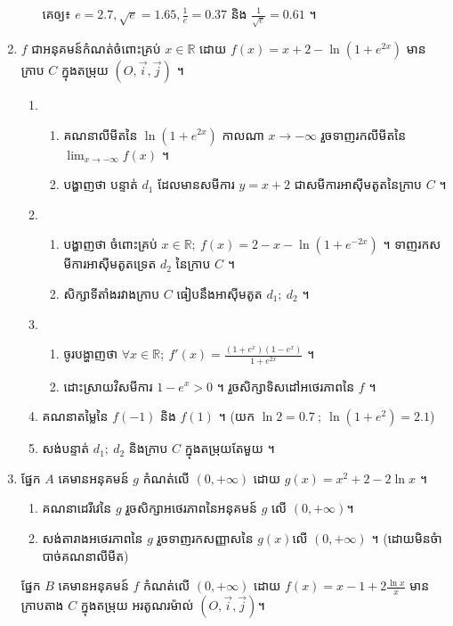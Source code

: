 \documentclass{officialexam}
\begin{document}
\begin{enumerate}[I]
\begin{enumerate}[k]
		គេឲ្យ៖ $e=2.7, \sqrt{e}=1.65, \frac{1}{e}=0.37$ និង $ \frac{1}{\sqrt{e}}=0.61$ ។
	\end{enumerate}
	\item $f$ ជាអនុគមន៍កំណត់ចំពោះគ្រប់ $x\in\mathbb{R}$ ដោយ $f(x)=x+2-\ln\left(1+e^{2x}\right)$ មានក្រាប $C$ ក្នុងតម្រុយ $\left(O, \vec{i}, \vec{j}\right)$ ។
	\begin{enumerate}[1]
		\item \begin{enumerate}[k]
			\item គណនាលីមីតនៃ $\ln\left(1+e^{2x}\right)$ កាលណា $x\to-\infty$ រួចទាញរកលីមីតនៃ $\lim_{x\to-\infty}f(x)$ ។
			\item បង្ហាញថា បន្ទាត់ $d_1$ ដែលមានសមីការ $y=x+2$ ជាសមីការអាស៊ីមតូតនៃក្រាប $C$ ។
		\end{enumerate}
		\item \begin{enumerate}[k]
			\item បង្ហាញថា ចំពោះគ្រប់ $x\in\mathbb{R};~ f(x)=2-x-\ln\left(1+e^{-2x}\right)$ ។ ទាញរកសមីការអាស៊ីមតូតទ្រេត $d_2$ នៃក្រាប $C$ ។
			\item សិក្សាទីតាំងរវាងក្រាប $C$ ធៀបនឹងអាស៊ីមតូត $d_1;~d_2$ ។
		\end{enumerate}
		\item \begin{enumerate}[k]
			\item ចូរបង្ហាញថា $\forall x\in\mathbb{R};~f'(x)=\frac{\left(1+e^x\right)\left(1-e^x\right)}{1+e^{2x}}$ ។
			\item ដោះស្រាយវិសមីការ $1-e^x>0$ ។ រួចសិក្សាទិសដៅអថេរភាពនៃ $f$ ។
		\end{enumerate}
		\item គណនាតម្លៃនៃ $f(-1)$ និង $f(1)$ ។ (យក $\ln2=0.7~;~\ln\left(1+e^2\right)=2.1$)
		\item សង់បន្ទាត់ $d_1;~d_2$ និងក្រាប $C$ ក្នុងតម្រុយតែមួយ ។
	\end{enumerate}
	\item {\color{khtug}\sffamily ផ្នែក $A$} គេមានអនុគមន៍ $g$ កំណត់លើ $(0,+\infty)$ ដោយ $g(x)=x^2+2-2\ln x$ ។
	\begin{enumerate}[k]
		\item គណនាដេរីវេនៃ $g$ រួចសិក្សាអថេរភាពនៃអនុគមន៍ $g$ លើ $(0, +\infty)$​។
		\item សង់តារាងអថេរភាពនៃ $g$ រួចទាញរកសញ្ញាសនៃ $g(x)$ ​​លើ $(0,+\infty)$ ។ (ដោយមិនចំាបាច់គណនាលីមីត)
	\end{enumerate}
	{\color{khtug} \sffamily ផ្នែក $B$} គេមានអនុគមន៍ $f$ កំណត់លើ $(0,+\infty)$ ដោយ $f(x)=x-1+2\frac{\ln x}{x}$ មានក្រាបតាង $C$ ក្នុងតម្រុយ អរតូណរម៉ាល់ $(O, \vec{i}, \vec{j})$។

\end{enumerate}
\end{document}
